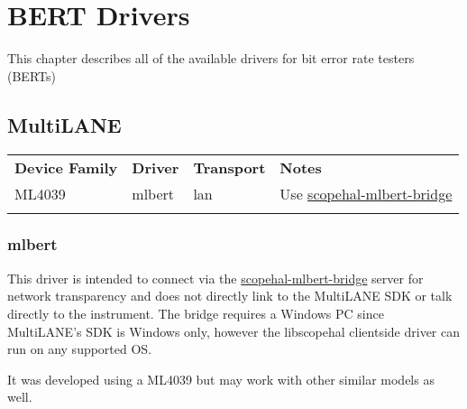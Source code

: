 \chapter{BERT Drivers}
\label{sec:bert-drivers}

This chapter describes all of the available drivers for bit error rate testers (BERTs)

\section{MultiLANE}

\begin{tabularx}{16cm}{lllX}
\thickhline
\textbf{Device Family} & \textbf{Driver} & \textbf{Transport} & \textbf{Notes} \\
\thickhline
ML4039 & mlbert & lan & Use \href{https://github.com/glscopeclient/scopehal-mlbert-bridge}{scopehal-mlbert-bridge} \\
\thickhline
\end{tabularx}

\subsection{mlbert}

This driver is intended to connect via the
\href{https://github.com/glscopeclient/scopehal-mlbert-bridge}{scopehal-mlbert-bridge} server for network transparency
and does not directly link to the MultiLANE SDK or talk directly to the instrument. The bridge requires a Windows PC
since MultiLANE's SDK is Windows only, however the libscopehal clientside driver can run on any supported OS.

It was developed using a ML4039 but may work with other similar models as well.
